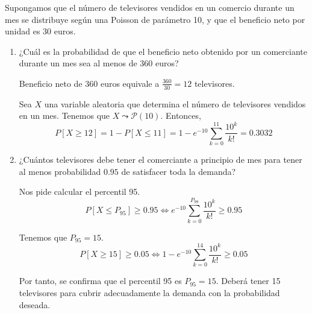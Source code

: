 \begin{ejercicio}
    Supongamos que el número de televisores vendidos en un comercio durante un mes se distribuye según una Poisson de parámetro 10, y que el beneficio neto por unidad es 30 euros.
    \begin{enumerate}
        \item ¿Cuál es la probabilidad de que el beneficio neto obtenido por un comerciante durante un mes sea al menos de 360 euros?

        Beneficio neto de 360 euros equivale a $\frac{360}{30}=12$ televisores.

        Sea $X$ una variable aleatoria que determina el número de televisores vendidos en un mes. Tenemos que $X\leadsto \mathcal{P}(10)$. Entonces,
        \begin{equation*}
            P[X\geq 12] = 1-P[X\leq 11] = 1-e^{-10}\sum_{k=0}^{11}\frac{10^k}{k!} = 0.3032
        \end{equation*}
        
        \item ¿Cuántos televisores debe tener el comerciante a principio de mes para tener al menos probabilidad $0.95$ de satisfacer toda la demanda?

        Nos pide calcular el percentil 95.
        \begin{equation*}
            P[X\leq P_{95}]\geq 0.95 \Longleftrightarrow e^{-10}\sum_{k=0}^{P_{99}}\frac{10^k}{k!} \geq 0.95
        \end{equation*}

        Tenemos que $P_{95}=15$.
        \begin{equation*}
            P[X\geq 15]\geq 0.05 \Longleftrightarrow 1 - e^{-10}\sum_{k=0}^{14}\frac{10^k}{k!} \geq 0.05
        \end{equation*}

        Por tanto, se confirma que el percentil 95 es $P_{95}=15$. Deberá tener 15 televisores para cubrir adecuadamente la demanda con la probabilidad deseada.
    \end{enumerate}
\end{ejercicio}

